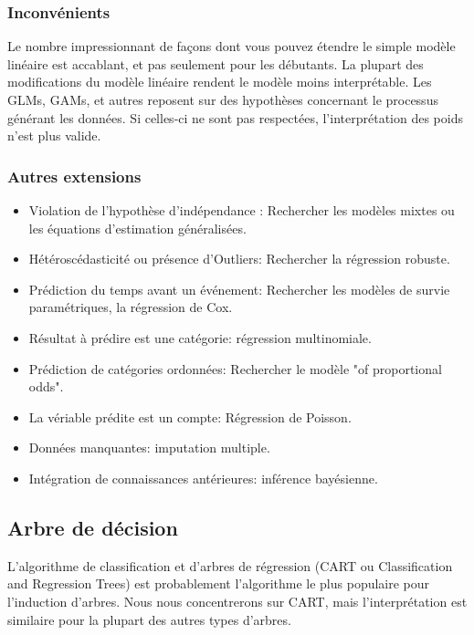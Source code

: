 \subsubsection{Inconvénients}
Le nombre impressionnant de façons dont vous pouvez étendre le simple modèle linéaire est accablant, et pas seulement pour les débutants. La plupart des modifications du modèle linéaire rendent le modèle moins interprétable. Les GLMs, GAMs, et autres reposent sur des hypothèses concernant le processus générant les données. Si celles-ci ne sont pas respectées, l'interprétation des poids n'est plus valide.

\subsubsection{Autres extensions}
\begin{itemize}
    \item Violation de l'hypothèse d'indépendance : Rechercher les modèles mixtes ou les équations d'estimation généralisées.
    \item Hétéroscédasticité ou présence d'Outliers: Rechercher la régression robuste.
    \item Prédiction du temps avant un événement: Rechercher les modèles de survie paramétriques, la régression de Cox.
    \item Résultat à prédire est une catégorie: régression multinomiale.
    \item Prédiction de catégories ordonnées: Rechercher le modèle "of proportional odds".
    \item La vériable prédite est un compte: Régression de Poisson.
    \item Données manquantes: imputation multiple.
    \item Intégration de connaissances antérieures: inférence bayésienne.
\end{itemize}



\subsection{Arbre de décision}

L'algorithme de classification et d'arbres de régression (CART ou Classification and Regression Trees) est probablement l'algorithme le plus populaire pour l'induction d'arbres. Nous nous concentrerons sur CART, mais l'interprétation est similaire pour la plupart des autres types d'arbres.

